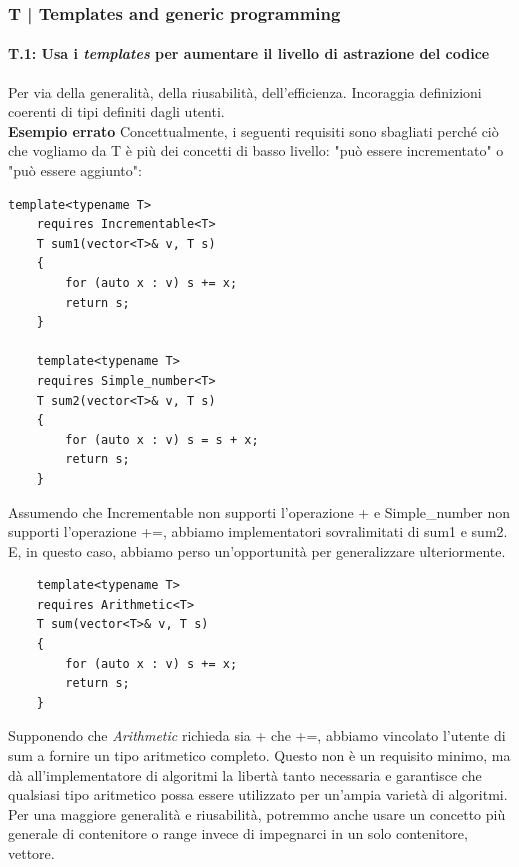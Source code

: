 \newpage

\subsubsection{T | Templates and generic programming}

\paragraph{T.1: Usa i \emph{templates} per aumentare il livello di astrazione del codice}

\textsf{\small Per via della generalità, della riusabilità, dell'efficienza. Incoraggia definizioni coerenti di tipi definiti dagli utenti.} \\

\textsf{\small \textbf{Esempio errato} Concettualmente, i seguenti requisiti sono sbagliati perché ciò che vogliamo da T è più dei concetti di basso livello: "può essere incrementato" o "può essere aggiunto": }

\begin{lstlisting}[frame=single, rulecolor=\color{red}]
	template<typename T>
	requires Incrementable<T>
	T sum1(vector<T>& v, T s)
	{
		for (auto x : v) s += x;
		return s;
	}
	
	template<typename T>
	requires Simple_number<T>
	T sum2(vector<T>& v, T s)
	{
		for (auto x : v) s = s + x;
		return s;
	}
\end{lstlisting}

\textsf{\small Assumendo che Incrementable non supporti l'operazione + e Simple\_number non supporti l'operazione +=, abbiamo implementatori sovralimitati di sum1 e sum2. E, in questo caso, abbiamo perso un'opportunità per generalizzare ulteriormente.}

\begin{lstlisting}
	template<typename T>
	requires Arithmetic<T>
	T sum(vector<T>& v, T s)
	{
		for (auto x : v) s += x;
		return s;
	}
\end{lstlisting}

\textsf{\small Supponendo che \emph{Arithmetic} richieda sia + che +=, abbiamo vincolato l'utente di sum a fornire un tipo aritmetico completo. Questo non è un requisito minimo, ma dà all'implementatore di algoritmi la libertà tanto necessaria e garantisce che qualsiasi tipo aritmetico possa essere utilizzato per un'ampia varietà di algoritmi. Per una maggiore generalità e riusabilità, potremmo anche usare un concetto più generale di contenitore o range invece di impegnarci in un solo contenitore, vettore.} \\

